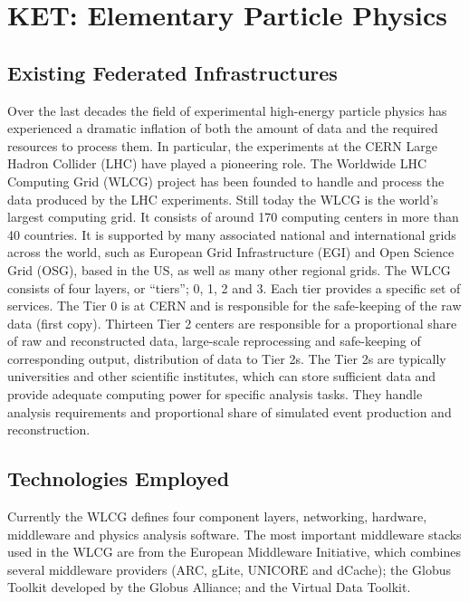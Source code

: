 \section{KET: Elementary Particle Physics}


\subsection{Existing Federated Infrastructures}
Over the last decades the field of experimental high-energy particle
physics has experienced a dramatic inflation of both the amount of
data and the required resources to process them. In particular, the
experiments at the CERN Large Hadron Collider (LHC) have played a
pioneering role. The Worldwide LHC Computing Grid (WLCG) project has
been founded to handle and process the data produced by the LHC
experiments. Still today  the WLCG is the world's largest computing
grid. It consists of around 170 computing centers in more than 40
countries.  It is supported by many associated national and
international grids across the world, such as European Grid
Infrastructure (EGI) and Open Science Grid (OSG), based in the US, as well as many other
regional grids.  The WLCG consists of four layers, or ``tiers''; 0, 1, 2
and 3. Each tier provides a specific set of services. The Tier 0 is at
CERN and is responsible for the safe-keeping of the raw data (first
copy). Thirteen Tier 2 centers are responsible for a proportional
share of raw and reconstructed data, large-scale reprocessing and
safe-keeping of corresponding output, distribution of data to Tier
2s. The Tier 2s are typically universities and other scientific
institutes, which can store sufficient data and provide adequate
computing power for specific analysis tasks. They handle analysis
requirements and proportional share of simulated event production and
reconstruction.




\subsection{Technologies Employed}
Currently the WLCG defines four component layers,  networking, hardware, middleware and
physics analysis software. The most important middleware stacks used
in the WLCG are from the European Middleware Initiative, which
combines several middleware providers (ARC, gLite, UNICORE and
dCache); the Globus Toolkit developed by the Globus Alliance; and the
Virtual Data Toolkit. 



